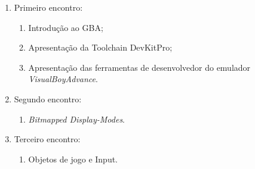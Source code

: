 \documentclass{article}
\begin{document}
\begin{enumerate}[label= (\alph*)]
    \item Primeiro encontro:
        \begin{enumerate}
            \item Introdução ao GBA\@;
            \item Apresentação da Toolchain DevKitPro;
            \item Apresentação das ferramentas de desenvolvedor do emulador
                \textit{VisualBoyAdvance}.
        \end{enumerate}
    \item Segundo encontro:
        \begin{enumerate}
            \item \textit{Bitmapped Display-Modes}.
        \end{enumerate}
    \item Terceiro encontro:
        \begin{enumerate}
            \item Objetos de jogo e Input.
        \end{enumerate}
\end{enumerate}

\nocite{*}


\end{document}
